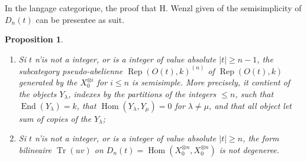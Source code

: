 \documentclass[11pt,a4paper]{article}
\theoremstyle{plain}
\newtheorem{proposition}[theorem]{Proposition}
\theoremstyle{definition}
\DeclareMathOperator{\Hom}{Hom}
\DeclareMathOperator{\End}{End}
\DeclareMathOperator{\Tr}{Tr}
\DeclareMathOperator{\Rep}{Rep}
\begin{document}
In the langage categorique, the proof that H. Wenzl given of the semisimplicity of $D_n(t)$ can be presentee as suit.

\begin{proposition}
\begin{enumerate}[label=(\roman*)]
\item Si $t$ n'is not a integer, or is a integer of value absolute $|t| \geq n - 1$, the subcategory pseudo-abelienne $\Rep(O(t), k)^{(n)}$ of $\Rep(O(t), k)$ generated by the $X_0^{\otimes i}$ for $i \leq n$ is semisimple. More precisely, it contient of the objects $Y_\lambda$, indexes by the partitions of the integers $\leq n$, such that $\End(Y_\lambda) = k$, that $\Hom(Y_\lambda, Y_\mu) = 0$ for $\lambda \neq \mu$, and that all object let sum of copies of the $Y_\lambda$;
\item Si $t$ n'is not a integer, or is a integer of value absolute $|t| \geq n$, the form bilineaire $\Tr(uv)$ on $D_n(t) = \Hom(X_0^{\otimes n}, X_0^{\otimes n})$ is not degeneree.
\end{enumerate}
\end{proposition}
\end{document}

